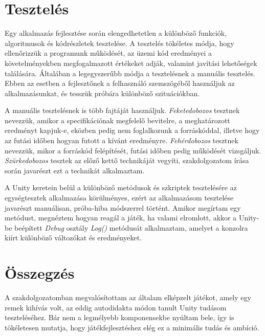 \documentclass[
]{thesis-ekf}
\theoremstyle{definition}
\theoremstyle{remark}
\begin{document}


\chapter{Tesztelés}

Egy alkalmazás fejlesztése során elengedhetetlen a különböző funkciók, algoritmusok és kódrészletek tesztelése. A tesztelés tökéletes módja, hogy ellenőrizzük a programunk működését, az üzemi kód eredményei a követelményekben megfogalmazott értékeket adják, valamint javítási lehetőségek találására. Általában a legegyszerűbb módja a tesztelésnek a manuális tesztelés. Ebben az esetben a fejlesztőnek a felhasználó szemszögéből használjuk az alkalmazásunkat, és tesszük próbára különböző szituációkban.

A manuális tesztelésnek is több fajtáját használjuk. \emph{Feketedobozos} tesztnek nevezzük, amikor a specifikációnak megfelelő bevitelre, a meghatározott eredményt kapjuk-e, eközben pedig nem foglalkozunk a forráskóddal, illetve hogy az futási időben hogyan futott a kívánt eredményre. \emph{Fehérdobozos} tesztnek nevezzük, mikor a forráskód felépítését, futási időben pedig működését vizsgáljuk. \emph{Szürkedobozos} tesztek az előző kettő technikáját vegyíti, szakdolgozatom írása során javarészt ezt a technikát alkalmaztam. \cite{BlackboxEn,WhiteboxEn,GrayboxEn}

A Unity keretein belül a különböző metódusok és szkriptek tesztelésére az egységtesztek alkalmazása körülményes, ezért az alkalmazásom tesztelése javarészt manuálisan, próba-hiba módszerrel történt. Amikor megírtam egy metódust, megnéztem hogyan reagál a játék, ha valami elromlott, akkor a Unity-be beépített \emph{Debug} osztály \emph{Log()} metódusát alkalmaztam, amelyet a konzolra kiírt különböző változókat és eredményeket. \cite{UnityDocsDebug}


\chapter*{Összegzés}

A szakdolgozatomban megvalósítottam az általam elképzelt játékot, amely egy remek kihívás volt, az eddig autodidakta módon tanult Unity tudásom teszteléséhez. Bár nem a legmélyebb komponensekbe nyúltam bele, így is tökéletesen mutatja, hogy játékfejlesztéshez elég ez a minimális tudás és ambíció.
\end{document}
